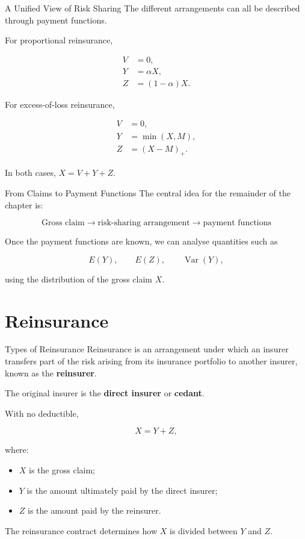 \documentclass[
  ignorenonframetext,
  aspectratio=169,
]{beamer}
\providecommand{\tightlist}{%
  \setlength{\itemsep}{0pt}\setlength{\parskip}{0pt}}
\begin{document}
\begin{frame}{A Unified View of Risk Sharing}
\protect{}\label{a-unified-view-of-risk-sharing}
The different arrangements can all be described through payment
functions.

For proportional reinsurance,

\[
\begin{aligned}
V&=0,\\
Y&=\alpha X,\\
Z&=(1-\alpha)X.
\end{aligned}
\]

For excess-of-loss reinsurance,

\[
\begin{aligned}
V&=0,\\
Y&=\min(X,M),\\
Z&=(X-M)_+.
\end{aligned}
\]

In both cases, \(\boxed{X=V+Y+Z}.\)
\end{frame}

\begin{frame}{From Claims to Payment Functions}
\protect{}\label{from-claims-to-payment-functions}
The central idea for the remainder of the chapter is:

\[
\boxed{
\text{Gross claim}
\longrightarrow
\text{risk-sharing arrangement}
\longrightarrow
\text{payment functions}
}
\]

Once the payment functions are known, we can analyse quantities such as

\[
E(Y),\qquad E(Z),\qquad
\operatorname{Var}(Y),
\]

using the distribution of the gross claim \(X\).
\end{frame}

\section{Reinsurance}\label{reinsurance}

\begin{frame}{Types of Reinsurance}
\protect{}\label{types-of-reinsurance}
Reinsurance is an arrangement under which an insurer transfers part of
the risk arising from its insurance portfolio to another insurer, known
as the \textbf{reinsurer}.

The original insurer is the \textbf{direct insurer} or \textbf{cedant}.

With no deductible,

\[
X=Y+Z,
\]

where:

\begin{itemize}
\tightlist
\item
  \(X\) is the gross claim;
\item
  \(Y\) is the amount ultimately paid by the direct insurer;
\item
  \(Z\) is the amount paid by the reinsurer.
\end{itemize}

The reinsurance contract determines how \(X\) is divided between \(Y\)
and \(Z\).
\end{frame}
\end{document}
